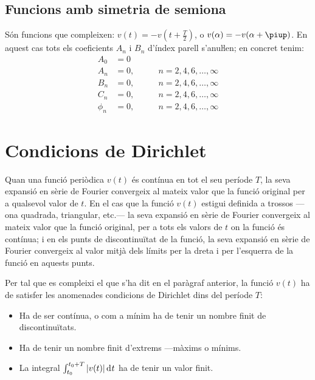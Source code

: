 \subsection{Funcions amb simetria de semiona}

Són funcions que compleixen: $v(t) = -v(t+\frac{T}{2})$, o $v(\alpha) = -v(\alpha+\piup)$. En aquest
cas tots els coeficients $A_n$ i $B_n$ d'índex parell s'anuŀlen;
en concret tenim:
\begin{subequations}
\begin{alignat}{2}
    A_0 &= 0       & \\[0.5ex]
    A_n &= 0,       &\qquad n = 2,4,6,\ldots,\infty\\[0.5ex]
    B_n &= 0,      &\qquad n = 2,4,6,\ldots,\infty\\[0.5ex]
    C_n &= 0,       &\qquad n = 2,4,6,\ldots,\infty\\[0.5ex]
    \phi_n &= 0, &\qquad n = 2,4,6,\ldots,\infty
\end{alignat}
\end{subequations}

\section{Condicions de Dirichlet}\label{sec:dirichlet}

Quan una funció periòdica $v(t)$  és contínua en tot el seu període
$T$, la seva expansió en sèrie de Fourier convergeix al mateix valor
que la funció original per a qualsevol valor de $t$.
En el cas que la funció $v(t)$ estigui definida a trossos ---ona quadrada, triangular, etc.--- la seva expansió en sèrie de Fourier convergeix al mateix valor que
la funció original, per a tots els valors de $t$ on la funció és
contínua; i en els punts de discontinuïtat de la funció, la seva
expansió en sèrie de Fourier convergeix al valor mitjà dels límits
per la dreta i per l'esquerra de la funció en aquests punts. 

Per tal que es compleixi el que s'ha dit en el paràgraf anterior, la funció $v(t)$ ha de satisfer les anomenades
condicions de Dirichlet dins del període $T$:
\begin{itemize}
   \item Ha de ser contínua, o com a mínim ha de tenir un nombre finit de discontinuïtats.
   \item Ha de tenir un nombre finit d'extrems ---màxims o mínims.
   \item La integral $\int_{t_0}^{t_0+T} |v(t)| \diff t$ ha de tenir un valor finit.
\end{itemize}

